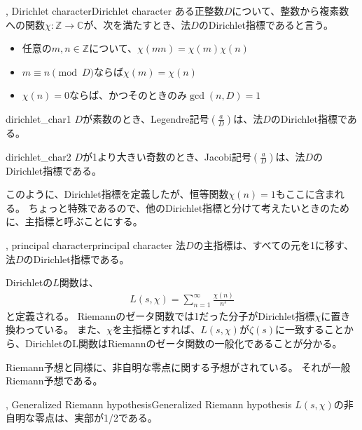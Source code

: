 \begin{Defi}{, Dirichlet character}{Dirichlet character}
ある正整数$D$について、整数から複素数への関数$\chi:\mathbb{Z}\to\mathbb{C}$が、次を満たすとき、法$D$のDirichlet指標であると言う。
\begin{itemize}
\item 任意の$m,n\in\mathbb{Z}$について、$\chi(mn)=\chi(m)\chi(n)$
\item $m\equiv n \pmod{D}$ならば$\chi(m)=\chi(n)$
\item $\chi(n)=0$ならば、かつそのときのみ$\gcd(n, D) = 1$
\end{itemize}
\end{Defi}

\begin{Exam}{}{dirichlet_char1}
$D$が素数のとき、Legendre記号$\left(\frac{a}{D}\right)$は、法$D$のDirichlet指標である。
\end{Exam}

\begin{Exam}{}{dirichlet_char2}
$D$が1より大きい奇数のとき、Jacobi記号$\left(\frac{a}{D}\right)$は、法$D$のDirichlet指標である。
\end{Exam}

このように、Dirichlet指標を定義したが、恒等関数$\chi(n)=1$もここに含まれる。
ちょっと特殊であるので、他のDirichlet指標と分けて考えたいときのために、主指標と呼ぶことにする。

\begin{Defi}{, principal character}{principal character}
法$D$の主指標は、すべての元を1に移す、法$D$のDirichlet指標である。
\end{Defi}

Dirichletの$L$関数は、
\begin{align*}
L(s,\chi) = \sum_{n=1}^{\infty} \frac{\chi(n)}{n^s}
\end{align*}
と定義される。
Riemannのゼータ関数では1だった分子がDirichlet指標$\chi$に置き換わっている。
また、$\chi$を主指標とすれば、$L(s, \chi)$が$\zeta(s)$に一致することから、DirichletのL関数はRiemannのゼータ関数の一般化であることが分かる。

Riemann予想と同様に、非自明な零点に関する予想がされている。
それが一般Riemann予想である。

\begin{Conj}{, Generalized Riemann hypothesis}{Generalized Riemann hypothesis}
$L(s,\chi)$の非自明な零点は、実部が1/2である。
\end{Conj}

